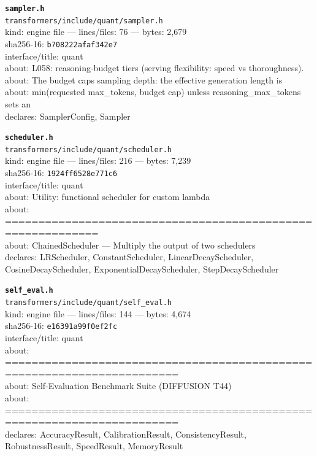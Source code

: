\noindent\textbf{\texttt{sampler.h}}\\
\texttt{transformers/include/quant/sampler.h}\\
kind: engine file --- lines/files: 76 --- bytes: 2,679\\
sha256-16: \texttt{b708222afaf342e7}\\
interface/title: quant\\
about: L058: reasoning-budget tiers (serving flexibility: speed vs thoroughness).\\
about: The budget caps sampling depth: the effective generation length is\\
about: min(requested max\_tokens, budget cap) unless reasoning\_max\_tokens sets an\\
declares: SamplerConfig, Sampler\\
\vspace*{6.0pt}

\noindent\textbf{\texttt{scheduler.h}}\\
\texttt{transformers/include/quant/scheduler.h}\\
kind: engine file --- lines/files: 216 --- bytes: 7,239\\
sha256-16: \texttt{1924ff6528e771c6}\\
interface/title: quant\\
about: Utility: functional scheduler for custom lambda\\
about: ============================================================\\
about: ChainedScheduler — Multiply the output of two schedulers\\
declares: LRScheduler, ConstantScheduler, LinearDecayScheduler, CosineDecayScheduler, ExponentialDecayScheduler, StepDecayScheduler\\
\vspace*{6.0pt}
\newpage

\noindent\textbf{\texttt{self\_eval.h}}\\
\texttt{transformers/include/quant/self\_eval.h}\\
kind: engine file --- lines/files: 144 --- bytes: 4,674\\
sha256-16: \texttt{e16391a99f0ef2fc}\\
interface/title: quant\\
about: ========================================================================\\
about: Self-Evaluation Benchmark Suite (DIFFUSION T44)\\
about: ========================================================================\\
declares: AccuracyResult, CalibrationResult, ConsistencyResult, RobustnessResult, SpeedResult, MemoryResult\\
\vspace*{6.0pt}


